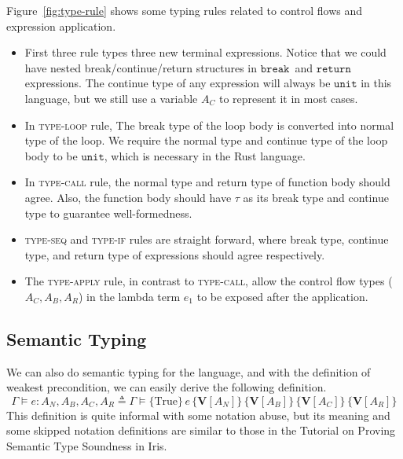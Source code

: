 \documentclass{article}
\numberwithin{algorithm}{section}
\newcommand{\progspec}[1]{\{ #1 \}}
\newcommand{\cbreak}{\texttt{break}\,}
\newcommand{\creturn}{\texttt{return}\,}
\newcommand{\tunit}{\texttt{unit}}
\newcommand{\vtype}[1]{\textbf{V}[#1]}
\newcommand{\htriple}[6]{\progspec{#1}\, #2\, \progspec{#3}\, \progspec{#4}\, \progspec{#5}\, \progspec{#6}}
\begin{document}
Figure~\ref{fig:type-rule} shows some typing rules related to control flows and expression application.
\begin{itemize}
    \item First three rule types three new terminal expressions. Notice that we could have nested break/continue/return structures in $\cbreak\!$ and $\creturn\!$ expressions. The continue type of any expression will always be $\tunit$ in this language, but we still use a variable $A_C$ to represent it in most cases.
    \item In \textsc{type-loop} rule, The break type of the loop body is converted into normal type of the loop. We require the normal type and continue type of the loop body to be $\tunit$, which is necessary in the Rust language.
    \item In \textsc{type-call} rule, the normal type and return type of function body should agree. Also, the function body should have $\tau$ as its break type and continue type to guarantee well-formedness.
    \item \textsc{type-seq} and \textsc{type-if} rules are straight forward, where break type, continue type, and return type of expressions should agree respectively.
    \item The \textsc{type-apply} rule, in contrast to \textsc{type-call}, allow the control flow types ($A_C, A_B, A_R$) in the lambda term $e_1$ to be exposed after the application.
\end{itemize}


\subsection{Semantic Typing}

We can also do semantic typing for the language, and with the definition of weakest precondition, we can easily derive the following definition.
$$
\Gamma \vDash e: A_N, A_B, A_C, A_R \triangleq \Gamma \vDash \htriple{\text{True}}{e}{\vtype{A_N}}{\vtype{A_B}}{\vtype{A_C}}{\vtype{A_R}}
$$
This definition is quite informal with some notation abuse, but its meaning and some skipped notation definitions are similar to those in the Tutorial on Proving Semantic Type Soundness in Iris.
\end{document}
